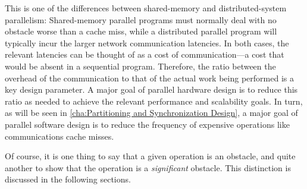 This is one of the differences between shared-memory and distributed-system
parallelism:
Shared-memory parallel programs must normally deal with no
obstacle worse than a cache miss, while a distributed parallel program
will typically incur the larger network communication latencies.
In both cases, the relevant latencies can be thought of as a cost of
communication---a cost that would be absent in a sequential program.
Therefore, the ratio between the overhead of the communication to
that of the actual work being performed is a key design parameter.
A major goal of parallel hardware design is to reduce this ratio as
needed to achieve the relevant performance and scalability goals.
In turn, as will be seen in
\cref{cha:Partitioning and Synchronization Design},
a major goal of parallel software design is to reduce the
frequency of expensive operations like communications cache misses.

Of course, it is one thing to say that a given operation is an obstacle,
and quite another to show that the operation is a \emph{significant}
obstacle.
This distinction is discussed in the following sections.
